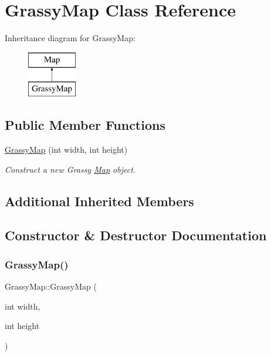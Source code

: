 \hypertarget{classGrassyMap}{}\section{Grassy\+Map Class Reference}
\label{classGrassyMap}
Inheritance diagram for Grassy\+Map\+:\begin{figure}[H]
\begin{center}
\leavevmode
\includegraphics[height=2.000000cm]{classGrassyMap}
\end{center}
\end{figure}
\subsection*{Public Member Functions}
\begin{DoxyCompactItemize}
\item 
\mbox{\hyperlink{classGrassyMap_ab150f8fa0936231b70c5546b43c5075a}{Grassy\+Map}} (int width, int height)
\begin{DoxyCompactList}\small\item\em Construct a new Grassy \mbox{\hyperlink{classMap}{Map}} object. \end{DoxyCompactList}\end{DoxyCompactItemize}
\subsection*{Additional Inherited Members}


\subsection{Constructor \& Destructor Documentation}
\mbox{\label{classGrassyMap_ab150f8fa0936231b70c5546b43c5075a}} 
\subsubsection{\texorpdfstring{GrassyMap()}{GrassyMap()}}
{\footnotesize\ttfamily Grassy\+Map\+::\+Grassy\+Map (\begin{DoxyParamCaption}\item[{int}]{width,  }\item[{int}]{height }\end{DoxyParamCaption})}



